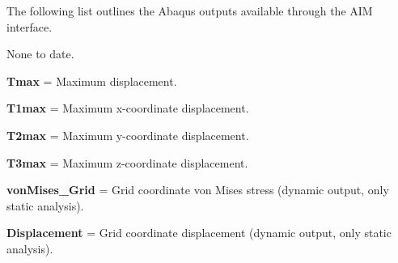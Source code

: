 The following list outlines the Abaqus outputs available through the AIM interface.

None to date.


\begin{DoxyItemize}
\item {\bfseries{Tmax}} = Maximum displacement.
\item {\bfseries{T1max}} = Maximum x-\/coordinate displacement.
\item {\bfseries{T2max}} = Maximum y-\/coordinate displacement.
\item {\bfseries{T3max}} = Maximum z-\/coordinate displacement.
\item {\bfseries{von\+Mises\+\_\+\+Grid}} = Grid coordinate von Mises stress (dynamic output, only static analysis).
\item {\bfseries{Displacement}} = Grid coordinate displacement (dynamic output, only static analysis). 
\end{DoxyItemize}